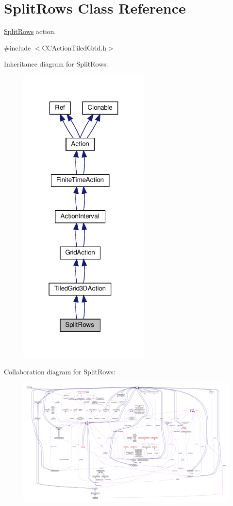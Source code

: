 \hypertarget{classSplitRows}{}\section{Split\+Rows Class Reference}
\label{classSplitRows}


\hyperlink{classSplitRows}{Split\+Rows} action.  




{\ttfamily \#include $<$C\+C\+Action\+Tiled\+Grid.\+h$>$}



Inheritance diagram for Split\+Rows\+:
\nopagebreak
\begin{figure}[H]
\begin{center}
\leavevmode
\includegraphics[width=187pt]{classSplitRows__inherit__graph}
\end{center}
\end{figure}


Collaboration diagram for Split\+Rows\+:
\nopagebreak
\begin{figure}[H]
\begin{center}
\leavevmode
\includegraphics[width=350pt]{classSplitRows__coll__graph}
\end{center}
\end{figure}
